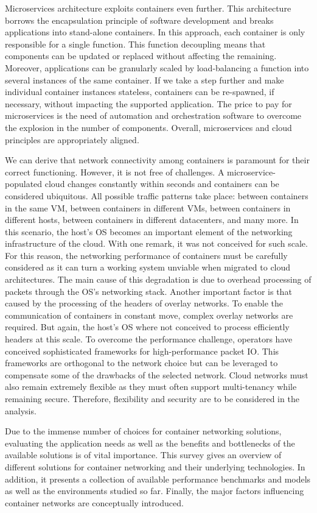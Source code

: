 \documentclass[conference]{IEEEtran}
\begin{document}
Microservices architecture exploits containers even further. This architecture borrows the encapsulation principle of software development and breaks applications into stand-alone containers. In this approach, each container is only responsible for a single function. This function decoupling means that components can be updated or replaced without affecting the remaining. Moreover, applications can be granularly scaled by load-balancing a function into several instances of the same container. If we take a step further and make individual container instances stateless, containers can be re-spawned, if necessary, without impacting the supported application. The price to pay for microservices is the need of automation and orchestration software to overcome the explosion in the number of components. Overall, microservices and cloud principles are appropriately aligned.

We can derive that network connectivity among containers is paramount for their correct functioning.  However, it is not free of challenges. A microservice-populated cloud changes constantly within seconds and containers can be considered ubiquitous. All possible traffic patterns take place: between containers in the same VM, between containers in different VMs, between containers in different hosts, between containers in different datacenters, and many more. In this scenario, the host's OS becomes an important element of the networking infrastructure of the cloud. With one remark, it was not conceived for such scale. For this reason, the networking performance of containers must be carefully considered as it can turn a working system unviable when migrated to cloud architectures. The main cause of this degradation is due to overhead processing of packets through the OS’s networking stack. Another important factor is that caused by the processing of the headers of overlay networks. To enable the communication of containers in constant move, complex overlay networks are required. But again, the host's OS where not conceived to process efficiently headers at this scale. To overcome the performance challenge, operators have conceived sophisticated frameworks for high-performance packet IO. This frameworks are orthogonal to the network choice but can be leveraged to compensate some of the drawbacks of the selected network. Cloud networks must also remain extremely flexible as they must often support multi-tenancy while remaining secure. Therefore, flexibility and security are to be considered in the analysis.

Due to the immense number of choices for container networking solutions, evaluating the application needs as well as the benefits and bottlenecks of the available solutions is of vital importance. This survey gives an overview of different solutions for container networking and their underlying technologies. In addition, it presents a collection of available performance benchmarks and models as well as the environments studied so far.  Finally, the major factors influencing container networks are conceptually introduced. 
\end{document}
